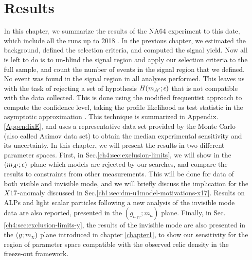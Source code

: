 
\newcommand{\pdirfour}{chapters/plots/chapter4}

\chapter{Results} %

\label{chapter4} %

In this chapter, we summarize the results of the NA64 experiment to this date, which include all the runs up to 2018 \cite{Banerjee:2020fue,Banerjee:2019hmi,NA64:2019imj,na64-prd,Banerjee:2018vgk,Banerjee:2016tad}. In the previous chapter, we estimated the background, defined the selection criteria, and computed the signal yield. Now all is left to do is to un-blind the signal region and apply our selection criteria to the full sample, and count the number of events in the signal region that we defined. No event was found in the signal region in all analyses performed. This leaves us with the task of rejecting a set of hypothesis $H(m_{A'};\epsilon)$ that is not compatible with the data collected. This is done using the modified frequentist approach to compute the confidence level, taking the profile likelihood as test statistic in the asymptotic approximation \cite{Read_2002,JUNK1999435,Cowan:2010js}. This technique is summarized in Appendix.\ref{AppendixE}, and uses a representative data set provided by the Monte Carlo (also called Asimov data set) to obtain the median experimental sensitivity and its uncertainty. In this chapter, we will present the results in two different parameter spaces. First, in Sec.\ref{ch4:sec:exclusion-limits}, we will show in the $(m_{A'};\epsilon)$ plane which models are rejected by our searches, and compare the results to constraints from other measurements. This will be done for data of both visible and invisible mode, and we will briefly discuss the implication for the $X17$-anomaly discussed in Sec.\ref{ch1:sec:dm-u1model-motivations-x17}. Results on ALPs and light scalar particles following a new analysis of the invisible mode data are also reported, presented in the $(g_{a\gamma \gamma};m_a)$ plane. Finally, in Sec.\ref{ch4:sec:exclusion-limits-y}, the results of the invisible mode are also presented in the $(y;m_{\chi})$ plane introduced in chapter \ref{chapter1}, to show our sensitivity for the region of parameter space compatible with the observed relic density in the freeze-out framework.


